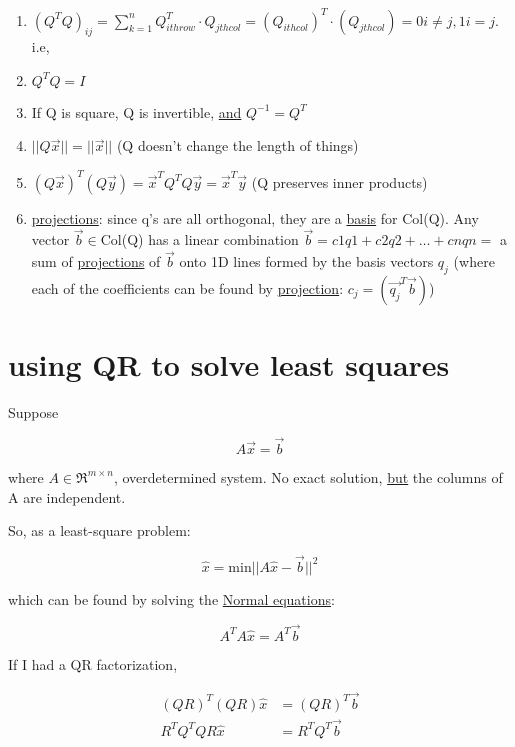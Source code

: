 \documentclass[twocolumn,draft]{article}
\begin{document}
  \begin{enumerate}
	  \item $(Q^{T}Q)_{ij} = \sum_{k=1}^{n}Q^{T}_{ith row}\cdot Q_{jth col}
	  					   = (Q_{ithcol})^{T}\cdot(Q_{jth col}) = 0 i\neq j, 1 i=j$. i.e,
	  \item $Q^{T}Q = I$
	  \item If Q is square, Q is invertible, \underline{and} $Q^{-1}=Q^{T}$
	  \item $||Q\vec{x}|| = ||\vec{x}||$ (Q doesn't change the length of things)
	  \item $(Q\vec{x})^{T}(Q\vec{y}) = \vec{x}^{T}Q^{T}Q\vec{y} = \vec{x}^{T}\vec{y}$
	  		(Q preserves inner products)
	  \item \underline{projections}: since q's are all orthogonal, they are a \underline{basis}
	  		for Col(Q). Any vector $\vec{b}\in$Col(Q) has a linear combination
			$\vec{b} = c1q1 + c2q2 + \ldots + cnqn=$ a sum of \underline{projections} of
			$\vec{b}$ onto 1D lines formed by the basis vectors $q_{j}$
			(where each of the coefficients can be found
			by \underline{projection}: $c_{j} = (\vec{q_{j}}^{T}\vec{b})$)
  \end{enumerate}
 
 \section*{using QR to solve least squares}
 
 Suppose
 
 \begin{equation*}
 	A\vec{x} = \vec{b}
 \end{equation*}
 
 where $A\in\Re^{m\times n}$, overdetermined system. No exact solution, \underline{but}
 the columns of A are independent. 
 
 So, as a least-square problem:
 
 \begin{equation*}
 	\hat{x} = \text{min}||A\hat{x}-\vec{b}||^{2}
 \end{equation*}
 
 which can be found by solving the \underline{Normal equations}:
 
 \begin{equation*}
 	A^{T}A\hat{x} = A^{T}\vec{b}
 \end{equation*}
 
 If I had a QR factorization,
 
 \begin{align*}
 	(QR)^{T}(QR)\hat{x} &= (QR)^{T}\vec{b} \\
	R^{T}Q^{T}QR\hat{x} &= R^{T}Q^{T}\vec{b}
 \end{align*}
 
\end{document}
